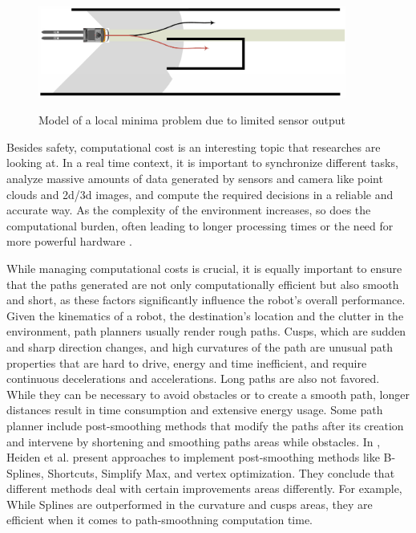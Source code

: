 \begin{figure}[H]
    \begin{center}
        \includegraphics[width=4in]{images/Chap1/local_minima.png}\\
        \caption{Model of a local minima problem 
        due to limited sensor output \cite{R28}}
        \label{local_minima}
        \end{center}
\end{figure}


Besides safety, computational cost is an interesting topic that researches 
are looking at. In a real time context, it is important to synchronize different tasks, 
analyze massive amounts of data generated by sensors and camera like point clouds and 2d/3d images, 
and compute the required decisions in a reliable and accurate way. As the complexity of the environment 
increases, so does the computational burden, often leading to longer processing times or the need for 
more powerful hardware \cite{R23}.

While managing computational costs is crucial, it is equally important to ensure that the paths 
generated are not only computationally efficient but also smooth and short, as these factors 
significantly influence the robot's overall performance.
Given the kinematics of a robot, the destination's location and the clutter in the environment, 
path planners usually render rough paths. Cusps, which are sudden and sharp direction changes, and high
curvatures of the path are unusual path properties that are hard to drive, energy and time inefficient, 
and require continuous decelerations and accelerations. Long paths are also not favored. While they can be 
necessary to avoid obstacles or to create a smooth path, longer distances result in time consumption and 
extensive energy usage. 
Some path planner include post-smoothing methods that modify the paths after its creation and intervene by
shortening and smoothing paths areas while obstacles. In \cite{R23}, Heiden et al. present approaches 
to implement post-smoothing methods like B-Splines, Shortcuts, Simplify Max, and vertex optimization. 
They conclude that different methods deal with certain 
improvements areas differently. For example, While Splines are outperformed in the curvature and cusps 
areas, they are efficient when it comes to path-smoothning computation time.  

